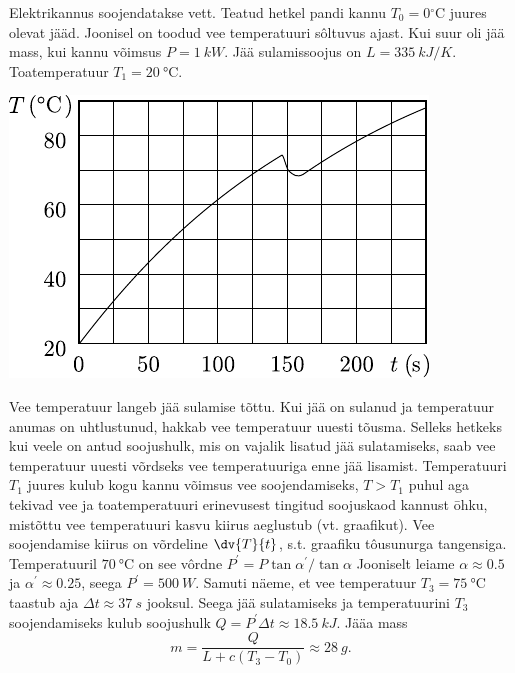 
Elektrikannus soojendatakse vett. Teatud hetkel pandi kannu $T_{0}=0{ }^{\circ} \mathrm{C}$ juures olevat jääd. Joonisel on toodud vee temperatuuri sôltuvus ajast. Kui suur oli jää mass, kui kannu võimsus $P = \SI{1}{kW}$. Jää sulamissoojus on $L = \SI{335}{kJ/K}$.
Toatemperatuur $T_1 = \SI{20}{\degreeCelsius}$.
\begin{center}
	\includegraphics[width=0.7\linewidth]{2004-v3g-06-yl.pdf}
\end{center}

\hint

\solu
Vee temperatuur langeb jää sulamise tõttu. Kui jää on sulanud ja temperatuur anumas on uhtlustunud, hakkab vee temperatuur uuesti tõusma. Selleks hetkeks kui veele on antud soojushulk, mis on vajalik lisatud jää sulatamiseks, saab vee temperatuur uuesti võrdseks vee temperatuuriga enne jää lisamist. Temperatuuri $T_{1}$ juures kulub kogu kannu võimsus vee soojendamiseks, $T>T_{1}$ puhul aga tekivad vee ja toatemperatuuri erinevusest tingitud soojuskaod kannust ōhku, mistõttu vee temperatuuri kasvu kiirus aeglustub (vt. graafikut). Vee soojendamise kiirus on võrdeline $\dv{T}{t}$, s.t. graafiku tôusunurga tangensiga. Temperatuuril $\SI{70}{\degreeCelsius}$ on see vôrdne $P^{\prime}=P \tan \alpha^{\prime} / \tan \alpha$ Jooniselt leiame $\alpha \approx \num{0,5}$ ja $\alpha^{\prime} \approx \num{0,25}$, seega $P^{\prime}=\SI{500}{W}$. Samuti näeme, et vee temperatuur $T_{3}=\SI{75}{\degreeCelsius}$ taastub aja $\Delta t \approx \SI{37}{s}$ jooksul. Seega jää sulatamiseks ja temperatuurini $T_{3}$ soojendamiseks kulub soojushulk $Q=P^{\prime} \Delta t \approx \SI{18,5}{kJ}$. Jääa mass
$$
m=\frac{Q}{L+c\left(T_{3}-T_{0}\right)} \approx \SI{28}{g}.
$$

\probend
